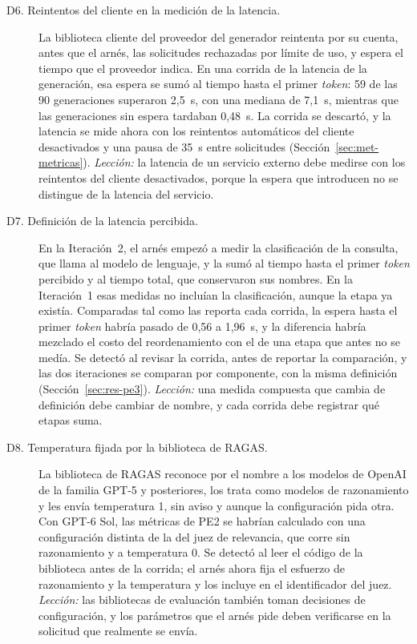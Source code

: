 \begin{description}
    \item[D6. Reintentos del cliente en la medición de la latencia.] La biblioteca cliente del proveedor del generador reintenta por su cuenta, antes que el arnés, las solicitudes rechazadas por límite de uso, y espera el tiempo que el proveedor indica. En una corrida de la latencia de la generación, esa espera se sumó al tiempo hasta el primer \textit{token}: 59 de las 90 generaciones superaron 2,5~s, con una mediana de 7,1~s, mientras que las generaciones sin espera tardaban 0,48~s. La corrida se descartó, y la latencia se mide ahora con los reintentos automáticos del cliente desactivados y una pausa de 35~s entre solicitudes (Sección~\ref{sec:met-metricas}). \emph{Lección:} la latencia de un servicio externo debe medirse con los reintentos del cliente desactivados, porque la espera que introducen no se distingue de la latencia del servicio.
    \item[D7. Definición de la latencia percibida.] En la Iteración~2, el arnés empezó a medir la clasificación de la consulta, que llama al modelo de lenguaje, y la sumó al tiempo hasta el primer \textit{token} percibido y al tiempo total, que conservaron sus nombres. En la Iteración~1 esas medidas no incluían la clasificación, aunque la etapa ya existía. Comparadas tal como las reporta cada corrida, la espera hasta el primer \textit{token} habría pasado de 0,56 a 1,96~s, y la diferencia habría mezclado el costo del reordenamiento con el de una etapa que antes no se medía. Se detectó al revisar la corrida, antes de reportar la comparación, y las dos iteraciones se comparan por componente, con la misma definición (Sección~\ref{sec:res-pe3}). \emph{Lección:} una medida compuesta que cambia de definición debe cambiar de nombre, y cada corrida debe registrar qué etapas suma.
    \item[D8. Temperatura fijada por la biblioteca de RAGAS.] La biblioteca de RAGAS reconoce por el nombre a los modelos de OpenAI de la familia GPT-5 y posteriores, los trata como modelos de razonamiento y les envía temperatura 1, sin aviso y aunque la configuración pida otra. Con GPT-6 Sol, las métricas de PE2 se habrían calculado con una configuración distinta de la del juez de relevancia, que corre sin razonamiento y a temperatura 0. Se detectó al leer el código de la biblioteca antes de la corrida; el arnés ahora fija el esfuerzo de razonamiento y la temperatura y los incluye en el identificador del juez. \emph{Lección:} las bibliotecas de evaluación también toman decisiones de configuración, y los parámetros que el arnés pide deben verificarse en la solicitud que realmente se envía.
\end{description}

